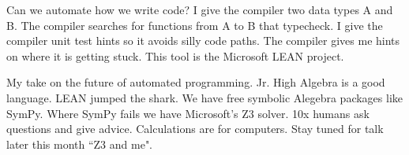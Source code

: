 \documentclass{beamer}
\begin{document}
\begin{frame}[fragile]


\end{frame}

\begin{frame}[fragile]
Can we automate how we write code?\newline
I give the compiler two data types A and B.\newline 
The compiler searches for functions from A to B that typecheck.\newline
I give the compiler unit test hints so it avoids silly code paths.\newline
The compiler gives me hints on where it is getting stuck.\newline\newline
This tool is the Microsoft LEAN project.
\end{frame}

\begin{frame}[fragile]
My take on the future of automated programming.\newline\newline
Jr. High Algebra is a good language. LEAN jumped the shark.\newline\newline
We have free symbolic Alegebra packages like SymPy.\newline\newline
Where SymPy fails we have Microsoft's Z3 solver.\newline\newline
10x humans ask questions and give advice. Calculations are for computers.\newline\newline
Stay tuned for talk later this month ``Z3 and me".
\end{frame}


%
\end{document}
